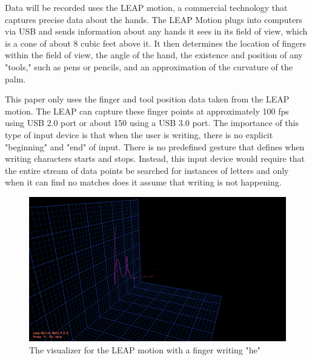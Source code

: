 Data will be recorded uses the LEAP motion, a commercial technology that captures precise data about the hands.
The LEAP Motion plugs into computers via USB and sends information about any hands it sees in its field of view, which is a cone of about 8 cubic feet above it.
It then determines the location of fingers within the field of view, the angle of the hand, the existence and position of any "tools," such as pens or pencils, and an approximation of the curvature of the palm.

This paper only uses the finger  and tool position data taken from the LEAP motion. The LEAP can capture these finger points at approximately 100 fps using USB 2.0 port or about 150 using a USB 3.0 port.
The importance of this type of input device is that when the user is writing, there is no explicit "beginning" and "end" of input. There is no predefined gesture that defines when writing characters starts and stops. Instead, this input device would require that the entire stream of data points be searched for instances of letters and only when it can find no matches does it assume that writing is not happening.
\begin{figure}
  \begin{center}
  \includegraphics[width=\columnwidth]{images/he-3d-2.PNG}
  \caption{The visualizer for the LEAP motion with a finger writing "he"}
  \label{fig:teaser}
  \end{center}  
\end{figure}
